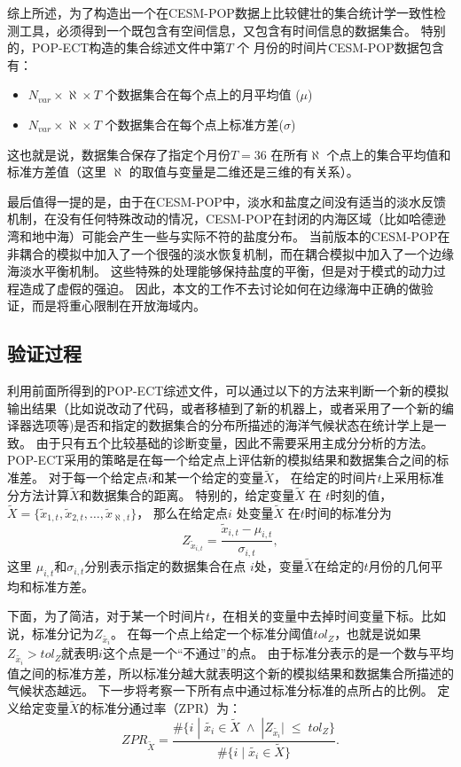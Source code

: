  
综上所述，为了构造出一个在CESM-POP数据上比较健壮的集合统计学一致性检测工具，必须得到一个既包含有空间信息，又包含有时间信息的数据集合。
特别的，POP-ECT构造的集合综述文件中第$T$ 个 月份的时间片CESM-POP数据包含有：
\begin{itemize}
 \item $N_{var} \times \aleph \times T$ 个数据集合在每个点上的月平均值 ($\mu$)
 \item $N_{var} \times \aleph \times T$ 个数据集合在每个点上标准方差($\sigma$)
 \end{itemize}
 这也就是说，数据集合保存了指定个月份$T = 36$ 在所有$\aleph$ 个点上的集合平均值和标准方差值（这里 $\aleph$ 的取值与变量是二维还是三维的有关系）。
 

最后值得一提的是，由于在CESM-POP中，淡水和盐度之间没有适当的淡水反馈机制，在没有任何特殊改动的情况，CESM-POP在封闭的内海区域（比如哈德逊湾和地中海）可能会产生一些与实际不符的盐度分布。
当前版本的CESM-POP在非耦合的模拟中加入了一个很强的淡水恢复机制，而在耦合模拟中加入了一个边缘海淡水平衡机制。
这些特殊的处理能够保持盐度的平衡，但是对于模式的动力过程造成了虚假的强迫。
因此，本文的工作不去讨论如何在边缘海中正确的做验证，而是将重心限制在开放海域内。

\subsection{验证过程}
\label{verify:ECTprocess}
 
利用前面所得到的POP-ECT综述文件，可以通过以下的方法来判断一个新的模拟输出结果（比如说改动了代码，或者移植到了新的机器上，或者采用了一个新的编译器选项等)是否和指定的数据集合的分布所描述的海洋气候状态在统计学上是一致。 
由于只有五个比较基础的诊断变量，因此不需要采用主成分分析的方法。 
POP-ECT采用的策略是在每一个给定点上评估新的模拟结果和数据集合之间的标准差。
对于每一个给定点$i$和某一个给定的变量$\tilde{{X}}$， 在给定的时间片$t$上采用标准分方法计算$\tilde{{X}}$和数据集合的距离。 
特别的，给定变量$\tilde{{X}}$ 在 $t$时刻的值，$\tilde{{X}} = \{ \tilde{x}_{1,t}, \tilde{x}_{2,t}, \dots, \tilde{x}_{\aleph,t}\}$， 那么在给定点$i$ 处变量$\tilde{{X}}$ 在$t$时间的标准分为
\begin{equation*}
Z_{\tilde{x}_{i,t}}=  \frac{\tilde{x}_{i,t} -\mu_{i,t}}{\sigma_{i,t}},
\end{equation*}
这里 $\mu_{i,t}$和$\sigma_{i,t}$分别表示指定的数据集合在点 $i$处，变量$\tilde{{X}}$在给定的$t$月份的几何平均和标准方差。  

 
下面，为了简洁，对于某一个时间片$t$，在相关的变量中去掉时间变量下标。比如说，标准分记为$Z_{\tilde{x_i}}$。 
在每一个点上给定一个标准分阈值$tol_{Z}$，也就是说如果 $Z_{\tilde{x_i}} > tol_{Z}$就表明$i$这个点是一个“不通过”的点。 
由于标准分表示的是一个数与平均值之间的标准方差，所以标准分越大就表明这个新的模拟结果和数据集合所描述的气候状态越远。 
下一步将考察一下所有点中通过标准分标准的点所占的比例。 定义给定变量$\tilde{X}$的标准分通过率（ZPR）为：
\begin{equation}\label{e:zpr}
ZPR_{\tilde{X}} = \frac{ \#\{i \;|\; \tilde{x_i} \in \tilde{X} \; \land \; |Z_{\tilde{x_i}}| \; \leq \; tol_{Z}\} }{\#\{i \;|\; \tilde{x_i} \in \tilde{X} \} }.
\end{equation}
 
